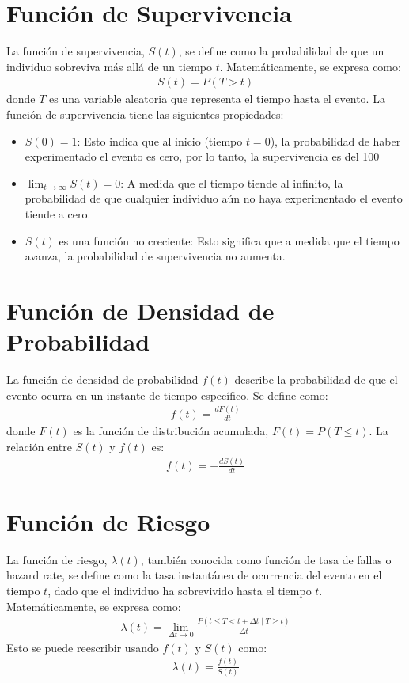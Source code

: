 \documentclass[a4paper]{report} %
\begin{document}
\section{Funci\'on de Supervivencia}
La funci\'on de supervivencia, $S(t)$, se define como la probabilidad de que un individuo sobreviva m\'as all\'a de un tiempo $t$. Matem\'aticamente, se expresa como:
\begin{eqnarray*}
S(t) = P(T > t)
\end{eqnarray*}
donde $T$ es una variable aleatoria que representa el tiempo hasta el evento. La funci\'on de supervivencia tiene las siguientes propiedades:
\begin{itemize}
    \item $S(0) = 1$: Esto indica que al inicio (tiempo $t=0$), la probabilidad de haber experimentado el evento es cero, por lo tanto, la supervivencia es del 100%
    \item $\lim_{t \to \infty} S(t) = 0$: A medida que el tiempo tiende al infinito, la probabilidad de que cualquier individuo a\'un no haya experimentado el evento tiende a cero.
    \item $S(t)$ es una funci\'on no creciente: Esto significa que a medida que el tiempo avanza, la probabilidad de supervivencia no aumenta.
\end{itemize}

\section{Funci\'on de Densidad de Probabilidad}
La funci\'on de densidad de probabilidad $f(t)$ describe la probabilidad de que el evento ocurra en un instante de tiempo espec\'ifico. Se define como:
\begin{eqnarray*}
f(t) = \frac{dF(t)}{dt}
\end{eqnarray*}
donde $F(t)$ es la funci\'on de distribuci\'on acumulada, $F(t) = P(T \leq t)$. La relaci\'on entre $S(t)$ y $f(t)$ es:
\begin{eqnarray*}
f(t) = -\frac{dS(t)}{dt}
\end{eqnarray*}

\section{Funci\'on de Riesgo}
La funci\'on de riesgo, $\lambda(t)$, tambi\'en conocida como funci\'on de tasa de fallas o hazard rate, se define como la tasa instant\'anea de ocurrencia del evento en el tiempo $t$, dado que el individuo ha sobrevivido hasta el tiempo $t$. Matem\'aticamente, se expresa como:
\begin{eqnarray*}
\lambda(t) = \lim_{\Delta t \to 0} \frac{P(t \leq T < t + \Delta t \mid T \geq t)}{\Delta t}
\end{eqnarray*}
Esto se puede reescribir usando $f(t)$ y $S(t)$ como:
\begin{eqnarray*}
\lambda(t) = \frac{f(t)}{S(t)}
\end{eqnarray*}
\end{document}
